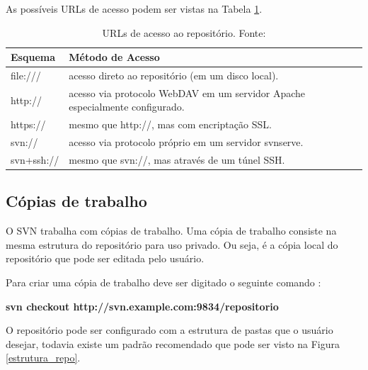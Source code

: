 As possíveis URLs de acesso podem ser vistas na Tabela \ref{tab:urls}.

\begin{table}[!h]
\centering
\caption{URLs de acesso ao repositório. Fonte: \cite{svn-book}}
\label{tab:urls}
\begin{tabular}{|l|l|}
\hline
\rowcolor[HTML]{01796F} 
{\color[HTML]{000000} \textbf{Esquema}} & {\color[HTML]{000000} \textbf{Método de Acesso}}                             \\ \hline
file:///                                & acesso direto ao repositório (em um disco local).                            \\ \hline
http://                                 & acesso via protocolo WebDAV em um servidor Apache especialmente configurado. \\ \hline
https://                                & mesmo que http://, mas com encriptação SSL.                                  \\ \hline
svn://                                  & acesso via protocolo próprio em um servidor svnserve.                        \\ \hline
svn+ssh://                              & mesmo que svn://, mas através de um túnel SSH.                               \\ \hline
\end{tabular}
\end{table}



\subsection{Cópias de trabalho}
  
O SVN trabalha com cópias de trabalho. Uma cópia de trabalho consiste na mesma estrutura do repositório para uso privado. Ou seja, é a cópia local do repositório que pode ser editada pelo usuário. 

Para criar uma cópia de trabalho deve ser digitado o seguinte comando \cite{svn-book}:


\begin{centering}
\colorbox{PineGreen}{
\begin{minipage}{320px}
  \textbf{svn checkout http://svn.example.com:9834/repositorio}
\end{minipage}
}

\end{centering}

O repositório pode ser configurado com a estrutura de pastas que o usuário desejar, todavia existe um padrão recomendado que pode ser visto na Figura 
\ref{estrutura_repo}.

